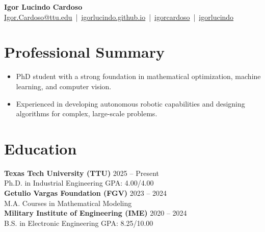 \documentclass[letterpaper,10pt]{article}
\newcommand{\socialicon}[1]{\raisebox{-0.05em}{\resizebox{!}{1em}{#1}}}
\newcommand{\dategray}[1]{\textcolor{textgray}{#1}}
\begin{document}
\begin{center}
    {\Huge\textbf{Igor Lucindo Cardoso}}\\[4pt]
    \small{
    \href{mailto:Igor.Cardoso@ttu.edu}{Igor.Cardoso@ttu.edu} \,|\, 
    \socialicon{\faGlobe} \href{https://igorlucindo.github.io}{igorlucindo.github.io} \,|\, 
    \socialicon{\faLinkedin} \href{https://www.linkedin.com/in/igorlucindo/}{igorcardoso} \,|\, 
    \socialicon{\faGithub} \href{https://github.com/igorlucindo}{igorlucindo}
    }
\end{center}
\vspace{-4pt}

\section{Professional Summary}
\begin{itemize}[leftmargin=14pt, nosep, topsep=2pt, itemsep=1pt]
    \item PhD student with a strong foundation in mathematical optimization, machine learning, and computer vision.
    \item Experienced in developing autonomous robotic capabilities and designing algorithms for complex, large-scale problems.
\end{itemize}

\section{Education}
\textbf{Texas Tech University (TTU)} \hfill \dategray{2025 – Present} \\
Ph.D. in Industrial Engineering \hfill \dategray{GPA: 4.00/4.00} \\[2pt]
\textbf{Getulio Vargas Foundation (FGV)} \hfill \dategray{2023 – 2024} \\
M.A. Courses in Mathematical Modeling \\[2pt]
\textbf{Military Institute of Engineering (IME)} \hfill \dategray{2020 – 2024} \\
B.S. in Electronic Engineering \hfill \dategray{GPA: 8.25/10.00}

\end{document}
